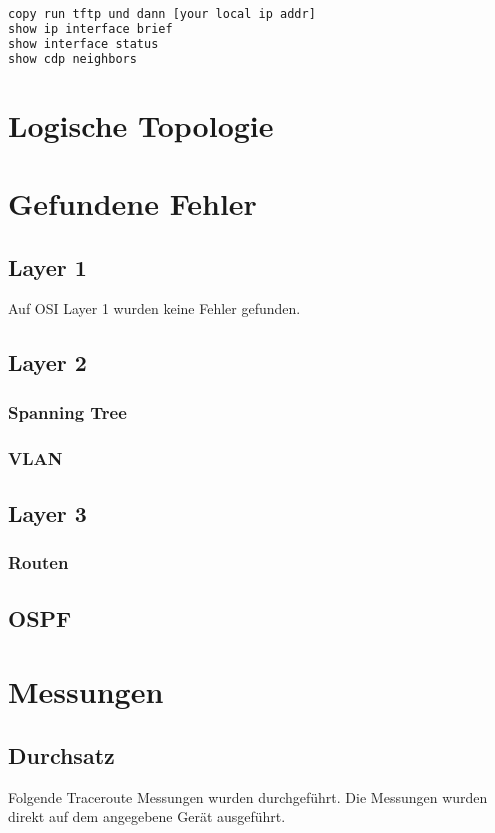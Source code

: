 \begin{lstlisting}[language=bash]
copy run tftp und dann [your local ip addr]
show ip interface brief
show interface status
show cdp neighbors
\end{lstlisting}

\section{Logische Topologie}

\section{Gefundene Fehler}
\subsection{Layer 1}
Auf OSI Layer 1 wurden keine Fehler gefunden.

\subsection{Layer 2}
\subsubsection{Spanning Tree}

\subsubsection{VLAN}

\subsection{Layer 3}

\subsubsection{Routen}

\subsection{OSPF}


\section{Messungen}
\subsection{Durchsatz}
Folgende Traceroute Messungen wurden durchgeführt. Die Messungen wurden direkt auf dem angegebene Gerät ausgeführt.

